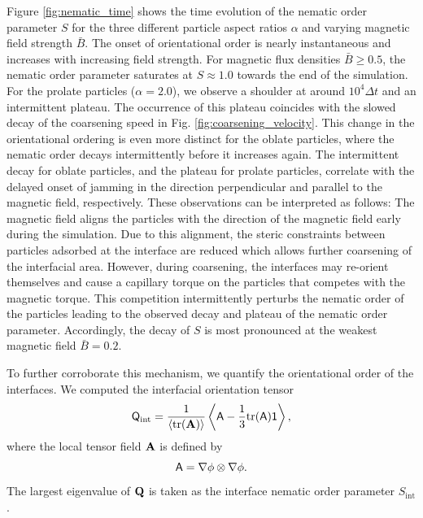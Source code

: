 Figure \ref{fig:nematic_time} shows the time evolution of the nematic
order parameter \(S\) for the three different particle aspect ratios
\(\alpha\) and varying magnetic field strength \(\bar{B}\). The onset of
orientational order is nearly instantaneous and increases with
increasing field strength. For magnetic flux densities
\(\bar{B}\ge0.5\), the nematic order parameter saturates at
\(S\approx 1.0\) towards the end of the simulation. For the prolate
particles (\(\alpha=2.0\)), we observe a shoulder at around
\(10^4\Delta t\) and an intermittent plateau. The occurrence of this
plateau coincides with the slowed decay of the coarsening speed in Fig.
\ref{fig:coarsening_velocity}. This change in the orientational ordering
is even more distinct for the oblate particles, where the nematic order
decays intermittently before it increases again. The intermittent decay
for oblate particles, and the plateau for prolate particles, correlate
with the delayed onset of jamming in the direction perpendicular and
parallel to the magnetic field, respectively. These observations can be
interpreted as follows: The magnetic field aligns the particles with the
direction of the magnetic field early during the simulation. Due to this
alignment, the steric constraints between particles adsorbed at the
interface are reduced which allows further coarsening of the interfacial
area. However, during coarsening, the interfaces may re-orient
themselves and cause a capillary torque on the particles that competes
with the magnetic torque. This competition intermittently perturbs the
nematic order of the particles leading to the observed decay and plateau
of the nematic order parameter. Accordingly, the decay of \(S\) is most
pronounced at the weakest magnetic field \(\bar{B}=0.2\).

To further corroborate this mechanism, we quantify the orientational
order of the interfaces. We computed the interfacial orientation tensor
%
\begin{equation}
\tens{Q}_{\text{int}} = \frac{1}{\langle \mathrm{tr}(\tens{A}) \rangle} 
\left\langle \tens{A} - \frac{1}{3} \mathrm{tr}(\tens{A}) \mathsf{1} \right\rangle ,
\end{equation}
%
where the local tensor field $\tens{A}$ is defined by
%
\begin{equation}
\tens{A} = \nabla\phi\otimes\nabla\phi .
\end{equation}
%
The largest eigenvalue of $\tens{Q}$ is taken as the
interface nematic order parameter $S_{\text{int}}$.

